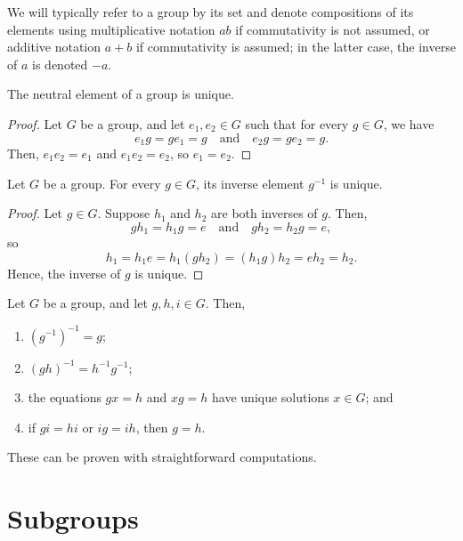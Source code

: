We will typically refer to a group by its set and denote compositions of its elements using multiplicative notation $ ab $ if commutativity is not assumed, or additive notation $ a+b $ if commutativity is assumed; in the latter case, the inverse of $ a $ is denoted $ -a $.

\begin{prop}
The neutral element of a group is unique.
\end{prop}
\begin{proof}
Let $ G $ be a group, and let $ e_1,e_2\in G $ such that for every $ g\in G $, we have
\begin{equation*}
    e_1g=ge_1=g \quad\text{and}\quad e_2g=ge_2=g.
\end{equation*}
Then, $ e_1e_2=e_1 $ and $ e_1e_2=e_2 $, so $ e_1=e_2 $.
\end{proof}

\begin{prop}
Let $ G $ be a group. For every $ g\in G $, its inverse element $ g^{-1} $ is unique.
\end{prop}
\begin{proof}
Let $ g\in G $. Suppose $ h_1 $ and $ h_2 $ are both inverses of $ g $. Then,
\begin{equation*}
    gh_1=h_1g=e \quad\text{and}\quad gh_2=h_2g=e,
\end{equation*}
so
\begin{equation*}
    h_1=h_1e=h_1(gh_2)=(h_1g)h_2=eh_2=h_2.
\end{equation*}
Hence, the inverse of $ g $ is unique.
\end{proof}

\begin{prop}\label{prop:group_elems}
Let $ G $ be a group, and let $ g,h,i\in G $. Then,
\begin{enumerate}
    \item $ (g^{-1})^{-1}=g $;
    \item $ (gh)^{-1}=h^{-1}g^{-1} $;
    \item the equations $ gx=h $ and $ xg=h $ have unique solutions $ x\in G $; and
    \item if $ gi=hi $ or $ ig=ih $, then $ g=h $.
\end{enumerate}
\end{prop}

These can be proven with straightforward computations.

\section{Subgroups}

